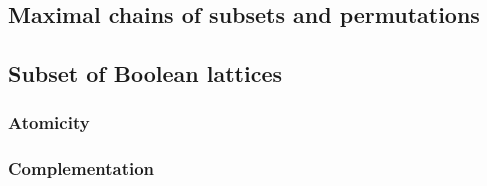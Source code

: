 \subsection{Maximal chains of subsets and permutations}
\subsection{Subset of Boolean lattices}
\subsubsection{Atomicity}
\subsubsection{Complementation}
